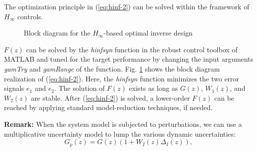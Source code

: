 \documentclass [11pt, proquest] {uwthesis}[2020/02/24]
\begin{document}
The optimization principle in (\ref{eq:hinf-2}) can be solved within
the framework of $H_{\infty}$ controls. 
\begin{figure}
\begin{centering}
\par\end{centering}
\caption{\label{fig:Block-diagram-for}Block diagram for the $H_{\infty}$-based
optimal inverse design}
\end{figure}
$F(z)$ can be solved by the \emph{hinfsyn} function in the robust
control toolbox of MATLAB and tuned for the target performance by
changing the input arguments\emph{ gamTry} and \emph{gamRange} of
the function. Fig. \ref{fig:Block-diagram-for} shows the block diagram
realization of (\ref{eq:hinf-2}). Here, the \emph{hinfsyn} function
minimizes the two error signals $e_{1}$ and $e_{2}$. The solution
of $F(z)$ exists as long as $G(z)$, $W_{1}(z)$, and $W_{2}(z)$
are stable. After (\ref{eq:hinf-2}) is solved, a lower-order $F(z)$
can be reached by applying standard model-reduction techniques, if
needed.

\textbf{Remark: }When the system model is subjected to perturbations,
we can use a multiplicative uncertainty model to lump the various
dynamic uncertainties:
\begin{equation}
G_{p}(z)=G(z)(1+W_{I}(z)\Delta_{I}(z)),\label{eq:uncertainty}
\end{equation}
\end{document}
